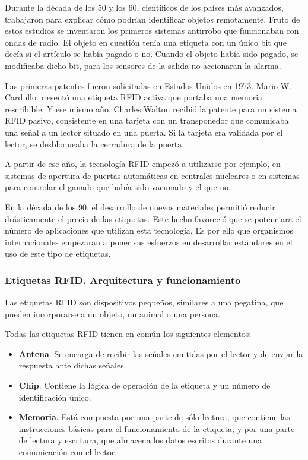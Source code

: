   Durante la década de los 50 y los 60, científicos de los países más
  avanzados, trabajaron para explicar cómo podrían identificar objetos
  remotamente. Fruto de estos estudios se inventaron los primeros sistemas
  antirrobo que funcionaban con ondas de radio. El objeto en cuestión tenía 
  una etiqueta con un único bit que decía si el artículo se había pagado o no.
  Cuando el objeto había sido pagado, se modificaba dicho bit, para los 
  sensores de la salida no accionaran la alarma.

  Las primeras patentes fueron solicitadas en Estados Unidos en 1973. Mario W.
  Cardullo presentó una etiqueta \acs{RFID} activa que portaba una memoria
  rescribible. Y ese mismo año, Charles Walton recibió la patente para un
  sistema \ac{RFID} pasivo, consistente en una tarjeta con un transponedor que
  comunicaba una señal a un lector situado en una puerta. Si la tarjeta era
  validada por el lector, se desbloqueaba la cerradura de la puerta.

  A partir de ese año, la tecnología \acs{RFID} empezó a utilizarse por ejemplo,
  en sistemas de apertura de puertas automáticas en centrales nucleares o en
  sistemas para controlar el ganado que había sido vacunado y el que no.

  En la década de los 90, el desarrollo de nuevos materiales permitió
  reducir drásticamente el precio de las etiquetas. Este hecho favoreció
  que se potenciara el número de aplicaciones que utilizan esta tecnología.
  Es por ello que organismos internacionales empezaran a poner sus esfuerzos en
  desarrollar estándares en el uso de este tipo de etiquetas.

    \subsubsection{Etiquetas \acs{RFID}. Arquitectura y funcionamiento}
  Las etiquetas \acs{RFID} son dispositivos pequeños, similares a una pegatina,
  que pueden incorporarse a un objeto, un animal o una persona. 
  
  Todas las etiquetas \acs{RFID} tienen en común los siguientes elementos:
  \begin{itemize}
    \item \textbf{Antena}. Se encarga de recibir las señales emitidas por el
  lector y de enviar la respuesta ante dichas señales.
    \item \textbf{Chip}. Contiene la lógica de operación de la etiqueta y un
  número de identificación único.
    \item \textbf{Memoria}. Está compuesta por una parte de sólo lectura,
  que contiene las instrucciones básicas para el funcionamiento de la etiqueta;
  y por una parte de lectura y escritura, que almacena los datos escritos
  durante una comunicación con el lector.
  \end{itemize}
  
